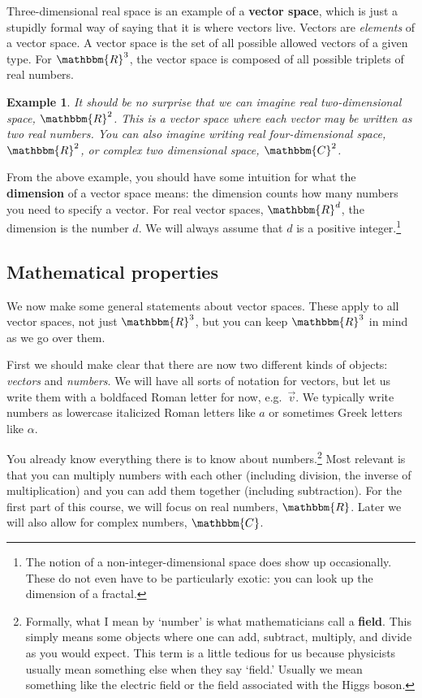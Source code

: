 \documentclass[12pt]{article}
\newtheorem{example}{Example}[section]
\begin{document}
Three-dimensional real space is an example of a \textbf{vector space}, which is just a stupidly formal way of saying that it is where vectors live. Vectors are \emph{elements} of a vector space. A vector space is the set of all possible allowed vectors of a given type. For $\mathbbm{R}^3$, the vector space is composed of all possible triplets of real numbers. 


\begin{example} It should be no surprise that we can imagine real two-dimensional space, $\mathbbm{R}^2$. This is a vector space where each vector may be written as two real numbers. You can also imagine writing real four-dimensional space, $\mathbbm{R}^2$, or complex two dimensional space, $\mathbbm{C}^2$. 
\end{example}

From the above example, you should have some intuition for what the \textbf{dimension} of a vector space means: the dimension counts how many numbers you need to specify a vector. For real vector spaces, $\mathbbm{R}^d$, the dimension is the number $d$. We will always assume that $d$ is a positive integer.\footnote{The notion of a non-integer-dimensional space does show up occasionally. These do not even have to be particularly exotic: you can look up the dimension of a fractal.}

\subsection{Mathematical properties}

We now make some general statements about vector spaces. These apply to all vector spaces, not just $\mathbbm{R}^3$, but you can keep $\mathbbm{R}^3$ in mind as we go over them.

First we should make clear that there are now two different kinds of objects: \emph{vectors} and \emph{numbers}. We will have all sorts of notation for vectors, but let us write them with a boldfaced Roman letter for now, e.g.~$\vec{v}$. We typically write numbers as lowercase italicized Roman letters like $a$ or sometimes Greek letters like $\alpha$. 

You already know everything there is to know about numbers.\footnote{Formally, what I mean by `number' is what mathematicians call a \textbf{field}. This simply means some objects where one can add, subtract, multiply, and divide as you would expect. This term is a little tedious for us because physicists usually mean something else when they say `field.' Usually we mean something like the electric field or the field associated with the Higgs boson.} Most relevant is that you can multiply numbers with each other (including division, the inverse of multiplication) and you can add them together (including subtraction). For the first part of this course, we will focus on real numbers, $\mathbbm{R}$. Later we will also allow for complex numbers, $\mathbbm{C}$.
\end{document}
